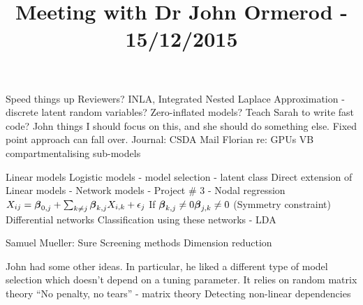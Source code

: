 \documentclass{amsart}
\title{Meeting with Dr John Ormerod - 15/12/2015}
\begin{document}
\maketitle

Speed things up
Reviewers? INLA, Integrated Nested Laplace Approximation - discrete latent random variables? Zero-inflated
models?
Teach Sarah to write fast code? John things I should focus on this, and she should do something else.
Fixed point approach can fall over.
Journal: CSDA
Mail Florian re: GPUs
VB compartmentalising sub-models

Linear models
Logistic models - model selection
								- latent class
Direct extension of Linear models - Network models - Project \# 3
 - Nodal regression
$X_{ij} = {\boldsymbol \beta}_{0, j} + \sum_{k \ne j} {\boldsymbol \beta}_{k, j} X_{i, k} + \epsilon_j$
If ${\boldsymbol \beta}_{k, j} \ne 0 {\boldsymbol \beta}_{j, k} \ne 0$ (Symmetry constraint)
Differential networks
Classification using these networks - LDA

Samuel Mueller:
	Sure
	Screening methods
	Dimension reduction

John had some other ideas. In particular, he liked a different type of model selection which doesn't depend
on a tuning parameter.
It relies on random matrix theory
``No penalty, no tears'' - matrix theory
Detecting non-linear dependencies
\end{document}
